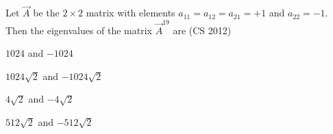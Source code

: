 \item Let $\vec{A}$ be the $2 \times 2$ matrix with elements  
$a_{11} = a_{12} = a_{21} = +1$ and $a_{22} = -1$.  
Then the eigenvalues of the matrix $\vec{A}^{19}$ are
\hfill (CS 2012)
\begin{enumerate}
\begin{multicols}{2}
    \item $1024$ and $-1024$
    \item $1024 \sqrt{2}$ and $-1024 \sqrt{2}$
    \item $4 \sqrt{2}$ and $-4 \sqrt{2}$
    \item $512 \sqrt{2}$ and $-512 \sqrt{2}$
\end{multicols}
\end{enumerate}

